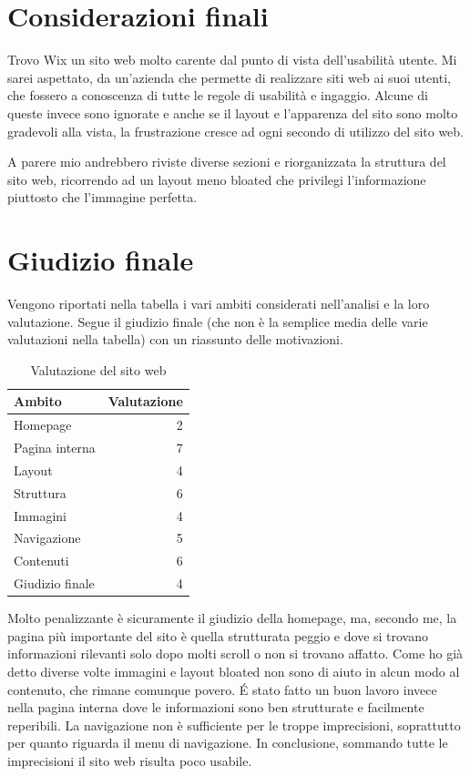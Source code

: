 \documentclass[11pt,a4paper]{article}
\newcommand*{\wix}{Wix}
\begin{document}
\section{Considerazioni finali}
\label{sec:final-remarks}

Trovo \wix{} un sito web molto carente dal punto di vista
dell'usabilità utente. Mi sarei aspettato, da un'azienda che permette
di realizzare siti web ai suoi utenti, che fossero a conoscenza di
tutte le regole di usabilità e ingaggio. Alcune di queste invece sono
ignorate e anche se il layout e l'apparenza del sito sono molto
gradevoli alla vista, la frustrazione cresce ad ogni secondo di
utilizzo del sito web. 

A parere mio andrebbero riviste diverse sezioni e riorganizzata la
struttura del sito web, ricorrendo ad un layout meno bloated che
privilegi l'informazione piuttosto che l'immagine perfetta. 

\section{Giudizio finale}
\label{sec:final-vote}

Vengono riportati nella tabella i vari ambiti considerati nell'analisi
e la loro valutazione. Segue il giudizio finale (che non è la semplice
media delle varie valutazioni nella tabella) con un riassunto delle
motivazioni.

\begin{table}
  \centering
  \begin{tabular}{||l|r||}
    \hline
    \textbf{Ambito} & \textbf{Valutazione} \\
    \hline\hline
     Homepage & 2 \\ 
     Pagina interna & 7 \\
     Layout & 4 \\
     Struttura & 6 \\
     Immagini & 4 \\
     Navigazione & 5 \\
     Contenuti & 6 \\
     \hline\hline
     Giudizio finale & 4 \\
     \hline
  \end{tabular}
  \caption{Valutazione del sito web}
  \label{table:rating}
\end{table}

Molto penalizzante è sicuramente il giudizio della homepage, ma,
secondo me, la pagina più importante del sito è quella strutturata
peggio e dove si trovano informazioni rilevanti solo dopo molti scroll
o non si trovano affatto. Come ho già detto diverse volte immagini e
layout bloated non sono di aiuto in alcun modo al contenuto, che
rimane comunque povero. \'E stato fatto un buon lavoro invece nella
pagina interna dove le informazioni sono ben strutturate e facilmente
reperibili. La navigazione non è sufficiente per le troppe
imprecisioni, soprattutto per quanto riguarda il menu di
navigazione. In conclusione, sommando tutte le imprecisioni il sito
web risulta poco usabile.
\end{document}

